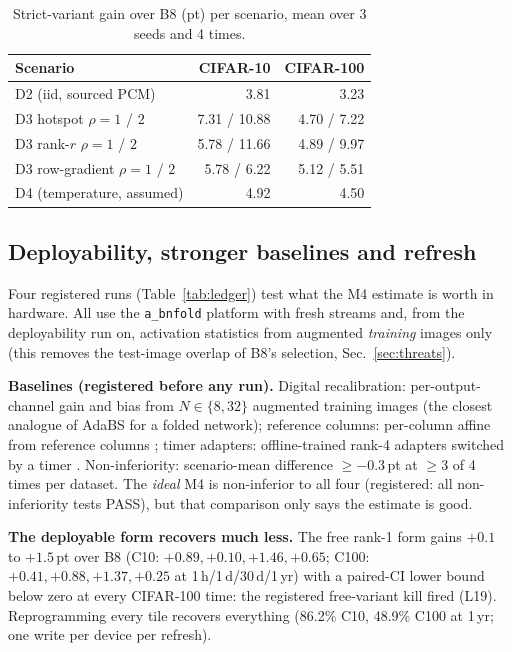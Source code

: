\documentclass[journal]{IEEEtran}
\newcommand{\mfour}{\textsc{M4}}
\newcommand{\bviii}{\textsc{B8}}
\newcommand{\pt}{\,pt}
\begin{document}
\begin{table}[t]
\caption{Strict-variant gain over \bviii{} (pt) per scenario, mean over 3 seeds and 4 times.}
\label{tab:scen}
\centering\footnotesize
\begin{tabular}{lrr}
\toprule
Scenario & CIFAR-10 & CIFAR-100 \\
\midrule
D2 (iid, sourced PCM) & 3.81 & 3.23 \\
D3 hotspot $\rho{=}1$ / $2$ & 7.31 / 10.88 & 4.70 / 7.22 \\
D3 rank-$r$ $\rho{=}1$ / $2$ & 5.78 / 11.66 & 4.89 / 9.97 \\
D3 row-gradient $\rho{=}1$ / $2$ & 5.78 / 6.22 & 5.12 / 5.51 \\
D4 (temperature, assumed) & 4.92 & 4.50 \\
\bottomrule
\end{tabular}
\end{table}


\subsection{Deployability, stronger baselines and refresh}
\label{sec:phaseh}
\label{sec:h2}
Four registered runs (Table~\ref{tab:ledger}) test what the \mfour{} estimate is worth in hardware. All use the \texttt{a\_bnfold} platform with fresh streams and, from the deployability run on, activation statistics from augmented \emph{training} images only (this removes the test-image overlap of \bviii{}'s selection, Sec.~\ref{sec:threats}).

\textbf{Baselines (registered before any run).} Digital recalibration: per-output-channel gain and bias from $N\in\{8,32\}$ augmented training images (the closest analogue of AdaBS for a folded network); reference columns: per-column affine from reference columns \cite{ibm11663458}; timer adapters: offline-trained rank-4 adapters switched by a timer \cite{vera2026}.
Non-inferiority: scenario-mean difference $\ge-0.3$\pt{} at $\ge3$ of 4 times per dataset. The \emph{ideal} \mfour{} is non-inferior to all four (registered: all non-inferiority tests PASS), but that comparison only says the estimate is good.

\textbf{The deployable form recovers much less.} The free rank-1 form gains $+0.1$ to $+1.5$\pt{} over \bviii{} (C10: $+0.89,+0.10,+1.46,+0.65$; C100: $+0.41,+0.88,+1.37,+0.25$ at 1\,h/1\,d/30\,d/1\,yr) with a paired-CI lower bound below zero at every CIFAR-100 time: the registered free-variant kill fired (L19).
Reprogramming every tile recovers everything (86.2\% C10, 48.9\% C100 at 1\,yr; one write per device per refresh).
\end{document}
